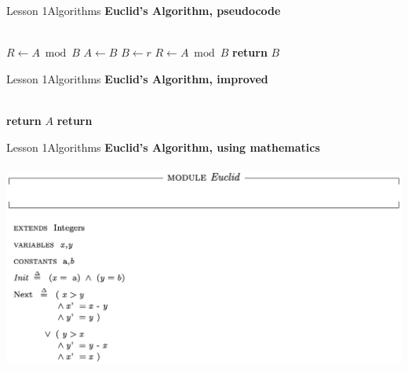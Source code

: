 \documentclass[aspectratio=1610]{beamer}
\begin{document}
\begin{frame}{Lesson 1}{Algorithms}
\Large
\textbf{Euclid's Algorithm, pseudocode}\\~\\

\label{GCD}
\begin{algorithmic}[1]
   \State $R\gets A\bmod B$
      \State $A\gets B$
      \State $B\gets r$
      \State $R\gets A\bmod B$
   \EndWhile\label{GCDendwhile}
   \State \textbf{return} $B$
\EndProcedure
\end{algorithmic}
\end{frame}



\begin{frame}{Lesson 1}{Algorithms}
\Large
\textbf{Euclid's Algorithm, improved}\\~\\

\label{Euclid}
\begin{algorithmic}[1]
    \State \textbf{return} $A$
\Else \State \textbf{return} 
\EndIf
\EndProcedure
\end{algorithmic}
\end{frame}



\begin{frame}{Lesson 1}{Algorithms}
\Large
\textbf{Euclid's Algorithm, using mathematics}\\~\\
\includegraphics[scale=0.5]{Images/gcdtla}
\end{frame}
\end{document}
